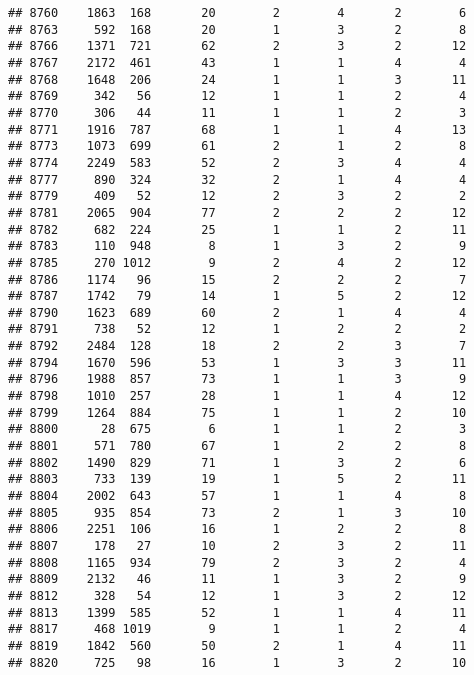 \documentclass[]{article}
\begin{document}
\begin{verbatim}
## 8760    1863  168       20        2        4       2        6
## 8763     592  168       20        1        3       2        8
## 8766    1371  721       62        2        3       2       12
## 8767    2172  461       43        1        1       4        4
## 8768    1648  206       24        1        1       3       11
## 8769     342   56       12        1        1       2        4
## 8770     306   44       11        1        1       2        3
## 8771    1916  787       68        1        1       4       13
## 8773    1073  699       61        2        1       2        8
## 8774    2249  583       52        2        3       4        4
## 8777     890  324       32        2        1       4        4
## 8779     409   52       12        2        3       2        2
## 8781    2065  904       77        2        2       2       12
## 8782     682  224       25        1        1       2       11
## 8783     110  948        8        1        3       2        9
## 8785     270 1012        9        2        4       2       12
## 8786    1174   96       15        2        2       2        7
## 8787    1742   79       14        1        5       2       12
## 8790    1623  689       60        2        1       4        4
## 8791     738   52       12        1        2       2        2
## 8792    2484  128       18        2        2       3        7
## 8794    1670  596       53        1        3       3       11
## 8796    1988  857       73        1        1       3        9
## 8798    1010  257       28        1        1       4       12
## 8799    1264  884       75        1        1       2       10
## 8800      28  675        6        1        1       2        3
## 8801     571  780       67        1        2       2        8
## 8802    1490  829       71        1        3       2        6
## 8803     733  139       19        1        5       2       11
## 8804    2002  643       57        1        1       4        8
## 8805     935  854       73        2        1       3       10
## 8806    2251  106       16        1        2       2        8
## 8807     178   27       10        2        3       2       11
## 8808    1165  934       79        2        3       2        4
## 8809    2132   46       11        1        3       2        9
## 8812     328   54       12        1        3       2       12
## 8813    1399  585       52        1        1       4       11
## 8817     468 1019        9        1        1       2        4
## 8819    1842  560       50        2        1       4       11
## 8820     725   98       16        1        3       2       10

\end{verbatim}
\end{document}

